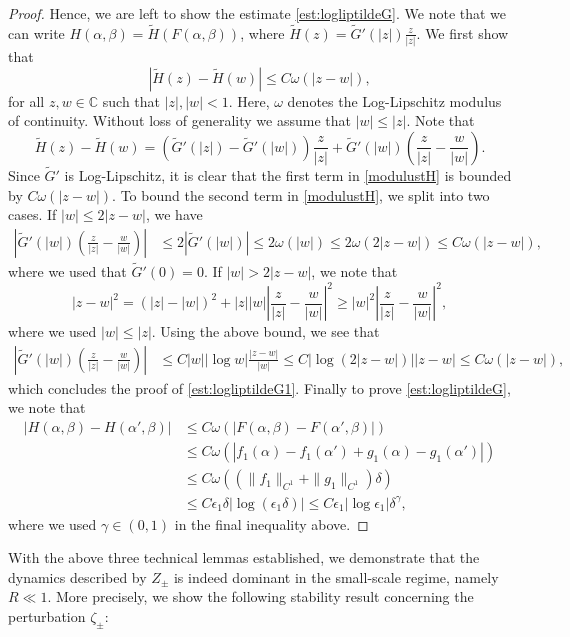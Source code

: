 \documentclass[11pt,reqno]{amsproc}
\newcommand{\eps}{\epsilon}
\newcommand{\ze}{\zeta}
\begin{document}
\begin{proof}
Hence, we are left to show the estimate \eqref{est:logliptildeG}. We note that we can write $H(\alpha,\beta) = \tilde{H}(F(\alpha,\beta))$, where $\tilde{H}(z) = \tilde{G}'(|z|)\frac{z}{|z|}$. We first show that
\begin{equation}
    \label{est:logliptildeG1}
    |\tilde{H}(z) - \tilde{H}(w)| \le C\omega(|z-w|),
\end{equation}
for all $z, w \in \mathbb{C}$ such that $|z|, |w| < 1$. Here, $\omega$ denotes the Log-Lipschitz modulus of continuity. Without loss of generality we assume that $|w| \le |z|$. Note that
\begin{equation}\label{modulustH}
    \tilde{H}(z) - \tilde{H}(w) = \left(\tilde{G}'(|z|) - \tilde{G}'(|w|)\right)\frac{z}{|z|} + \tilde{G}'(|w|)\left(\frac{z}{|z|}-\frac{w}{|w|}\right).
\end{equation}
Since $\tilde{G}'$ is Log-Lipschitz, it is clear that the first term in \eqref{modulustH} is  bounded by $C\omega(|z-w|)$. To bound the second term in \eqref{modulustH}, we split into two cases. If $|w| \le 2|z-w|$, we have
\begin{align*}
    \left|\tilde{G}'(|w|)\left(\frac{z}{|z|}-\frac{w}{|w|}\right)\right| &\le 2|\tilde{G}'(|w|)| \le 2\omega(|w|) \le 2\omega(2|z-w|) \le C\omega(|z-w|),
\end{align*}
where we used that $\tilde{G}'(0) = 0$. If $|w| > 2|z-w|$, we note that
$$
|z-w|^2 = (|z| - |w|)^2 + |z||w| \left|\frac{z}{|z|}-\frac{w}{|w|}\right|^2 \ge |w|^2\left|\frac{z}{|z|}-\frac{w}{|w|}\right|^2,
$$
where we used $|w| \le |z|$. Using the above bound, we see that
\begin{align*}
    \left|\tilde{G}'(|w|)\left(\frac{z}{|z|}-\frac{w}{|w|}\right)\right| &\le C|w| |\log w| \frac{|z-w|}{|w|} \le C|\log (2|z-w|)| |z-w| \le C\omega(|z-w|),
\end{align*}
which concludes the proof of \eqref{est:logliptildeG1}. Finally to prove \eqref{est:logliptildeG}, we note that
\begin{align*}
    |H(\alpha,\beta) - H(\alpha',\beta)| &\le C\omega(|F(\alpha,\beta) - F(\alpha',\beta)|)\\
    &\le C\omega(|f_1(\alpha) - f_1(\alpha') + g_1(\alpha) - g_1(\alpha')|)\\
    &\le C\omega((\|f_1\|_{C^1} + \|g_1\|_{C^1})\delta)\\
    &\le C\eps_1\delta |\log(\eps_1\delta)| \le C\eps_1|\log \eps_1| \delta^\gamma,
\end{align*}
where we used $\gamma \in (0,1)$ in the final inequality above. 
\end{proof}
With the above three technical lemmas established, we demonstrate that the dynamics described by $Z_\pm$ is indeed dominant in the small-scale regime, namely $R \ll 1$. More precisely, we show the following stability result concerning the perturbation $\ze_\pm$:
\end{document}
